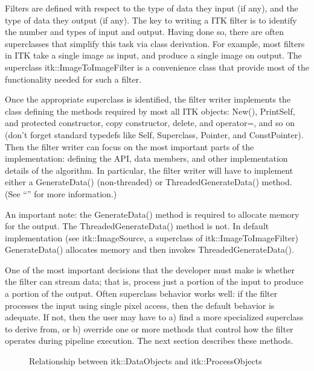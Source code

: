 Filters are defined with respect to the type of data they input (if any), and
the type of data they output (if any). The key to writing a ITK filter is to
identify the number and types of input and output. Having done so, there are
often superclasses that simplify this task via class derivation. For example,
most filters in ITK take a single image as input, and produce a single image
on output. The superclass itk::ImageToImageFilter is a convenience class that
provide most of the functionality needed for such a filter.

Once the appropriate superclass is identified, the filter writer implements
the class defining the methods required by most all ITK objects: New(),
PrintSelf, and protected constructor, copy constructor, delete, and
operator=, and so on (don't forget standard typedefs like Self, Superclass,
Pointer, and ConstPointer). Then the filter writer can focus on the most
important parts of the implementation: defining the API, data members, and
other implementation details of the algorithm. In particular, the filter
writer will have to implement either a GenerateData() (non-threaded) or
ThreadedGenerateData() method. (See ``'' for more information.)

An important note: the GenerateData() method is required to allocate memory
for the output. The ThreadedGenerateData() method is not. In default
implementation (see itk::ImageSource, a superclass of
itk::ImageToImageFilter) GenerateData() allocates memory and then invokes 
ThreadedGenerateData().

One of the most important decisions that the developer must make is whether
the filter can stream data; that is, process just a portion of the input to
produce a portion of the output. Often superclass behavior works well: if the
filter processes the input using single pixel access, then the default
behavior is adequate. If not, then the user may have to a) find a more
specialized superclass to derive from, or b) override one or more methods
that control how the filter operates during pipeline execution. The next
section describes these methods.

\begin{figure}
  \par\centering
  \caption{\label{fig:DataPipeLineOneConnection}Relationship between itk::DataObjects and itk::ProcessObjects }
  \par
\end{figure}

